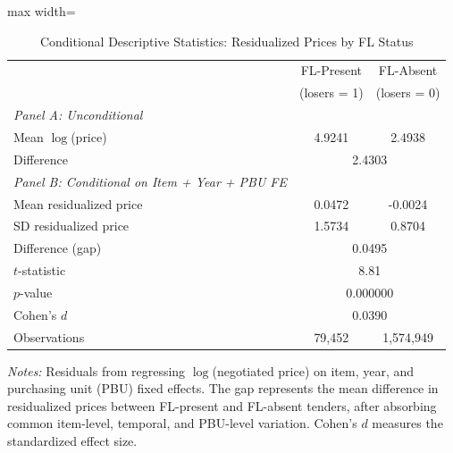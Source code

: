 \begin{table}[htbp]
\centering
\caption{Conditional Descriptive Statistics: Residualized Prices by FL Status}
\label{tab:conditional_descstats}
\begin{adjustbox}{max width=\textwidth}
\begin{threeparttable}
\small
\begin{tabular}{lcc}
\toprule
 & FL-Present & FL-Absent \\
 & (losers = 1) & (losers = 0) \\
\midrule
\textit{Panel A: Unconditional} & & \\
Mean $\log$(price) & 4.9241 & 2.4938 \\
Difference & \multicolumn{2}{c}{2.4303} \\
\midrule
\textit{Panel B: Conditional on Item + Year + PBU FE} & & \\
Mean residualized price & 0.0472 & -0.0024 \\
SD residualized price & 1.5734 & 0.8704 \\
Difference (gap) & \multicolumn{2}{c}{0.0495} \\
$t$-statistic & \multicolumn{2}{c}{8.81} \\
$p$-value & \multicolumn{2}{c}{0.000000} \\
Cohen's $d$ & \multicolumn{2}{c}{0.0390} \\
\midrule
Observations & 79,452 & 1,574,949 \\
\bottomrule
\end{tabular}
\begin{tablenotes}
\small
\item \textit{Notes:} Residuals from regressing $\log$(negotiated price) on item,
year, and purchasing unit (PBU) fixed effects. The gap represents the mean
difference in residualized prices between FL-present and FL-absent tenders,
after absorbing common item-level, temporal, and PBU-level variation.
Cohen's $d$ measures the standardized effect size.
\end{tablenotes}
\end{threeparttable}
\end{adjustbox}
\end{table}
